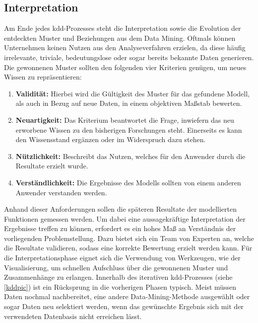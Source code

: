\newpage
\subsection{Interpretation}
Am Ende jedes \gls{kdd}-Prozesses steht die Interpretation sowie die Evolution der entdeckten Muster und Beziehungen aus dem Data Mining. Oftmals können Unternehmen keinen Nutzen aus den Analyseverfahren erzielen, da diese häufig irrelevante, triviale, bedeutungslose oder sogar bereits bekannte Daten generieren. Die gewonnenen Muster sollten den folgenden vier Kriterien genügen, um neues Wissen zu repräsentieren:

\begin{enumerate}
\item \textbf{Validität:} Hierbei wird die Gültigkeit des Muster für das gefundene Modell, als auch in Bezug auf neue Daten, in einem objektiven Maßstab bewerten.
\item \textbf{Neuartigkeit:} Das Kriterium beantwortet die Frage, inwiefern das neu erworbene Wissen zu den bisherigen Forschungen steht. Einerseits es kann den Wissensstand ergänzen oder im Widerspruch dazu stehen.
\item \textbf{Nützlichkeit:} Beschreibt das Nutzen, welches für den Anwender durch die Resultate erzielt wurde.
\item \textbf{Verständlichkeit:} Die Ergebnisse des Modells sollten von einem anderen Anwender verstanden werden.
\end{enumerate}

Anhand dieser Anforderungen sollen die späteren Resultate der modellierten Funktionen gemessen werden. Um dabei eine aussagekräftige Interpretation der Ergebnisse treffen zu können, erfordert es ein hohes Maß an Verständnis der vorliegenden Problemstellung. Dazu bietet sich ein Team von Experten an, welche die Resultate validieren, sodass eine korrekte Bewertung erzielt werden kann. Für die Interpretationsphase eignet sich die Verwendung von Werkzeugen, wie der Visualisierung, um schnellen Aufschluss über die gewonnenen Muster und Zusammenhänge zu erlangen. Innerhalb des iterativen \gls{kdd}-Prozesses (siehe \vref{kddpic}) ist ein Rücksprung in die vorherigen Phasen typisch. Meist müssen Daten nochmal nachbereitet, eine andere Data-Mining-Methode ausgewählt oder sogar Daten neu selektiert werden, wenn das gewünschte Ergebnis sich mit der verwendeten Datenbasis nicht erreichen lässt.